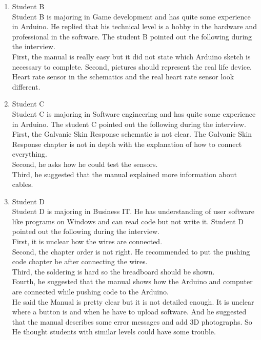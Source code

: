 \documentclass[conference]{IEEEtran}
\begin{document}
\begin{enumerate}
\begin{enumerate}
					\item Student B\\
					Student B is majoring in Game development and has  quite some experience in Arduino. He replied that his technical level is a hobby in the hardware and professional in the software. The student B pointed out the following during the interview.\\
					First, the manual is really easy but it did not state which Arduino sketch is necessary to complete.
					Second, pictures should represent the real life device. Heart rate sensor in the schematics and the real heart rate sensor look different.\\
					
					\item Student C\\
					Student C is majoring in Software engineering and has  quite some experience in Arduino. The student C pointed out the following during the interview.\\
					First, the Galvanic Skin Response schematic is not clear. The Galvanic Skin Response chapter is not in depth with the explanation of how to connect everything.\\
					Second, he asks how he could test the sensors.\\
					Third, he suggested that the manual explained more information about cables.\\

					\item Student D\\
					Student D is majoring in Business IT. He has understanding of user software like programs on Windows and can read code but not write it. Student D pointed out the following during the interview.\\
					First, it is unclear how the wires are connected.\\
					Second, the chapter order is not right. He recommended to put the pushing code chapter be after connecting the wires.\\
					Third, the soldering is hard so the breadboard should be shown.\\
					Fourth, he suggested that the manual shows how the Arduino and computer are connected while pushing code to the Arduino.\\
					He said the Manual is pretty clear but it is not detailed enough. It is unclear where a button is and when he have to upload software. And he suggested that the manual describes some error messages and add 3D photographs. So He thought students with similar levels could have some trouble. 
					

\end{enumerate}
\end{enumerate}
\end{document}
